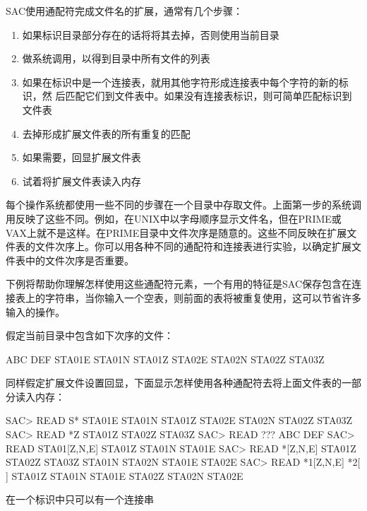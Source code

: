 SAC使用通配符完成文件名的扩展，通常有几个步骤：
\begin{enumerate}
\item 如果标识目录部分存在的话将将其去掉，否则使用当前目录
\item 做系统调用，以得到目录中所有文件的列表
\item 如果在标识中是一个连接表，就用其他字符形成连接表中每个字符的新的标识，然	  后匹配它们到文件表中。如果没有连接表标识，则可简单匹配标识到文件表
\item 去掉形成扩展文件表的所有重复的匹配
\item 如果需要，回显扩展文件表
\item 试着将扩展文件表读入内存
\end{enumerate}

每个操作系统都使用一些不同的步骤在一个目录中存取文件。上面第一步的系统调用反映了这些不同。例如，在UNIX中以字母顺序显示文件名，但在PRIME或VAX上就不是这样。在PRIME目录中文件次序是随意的。这些不同反映在扩展文件表的文件次序上。你可以用各种不同的通配符和连接表进行实验，以确定扩展文件表中的文件次序是否重要。

下例将帮助你理解怎样使用这些通配符元素，一个有用的特征是SAC保存包含在连接表上的字符串，当你输入一个空表，则前面的表将被重复使用，这可以节省许多输入的操作。

假定当前目录中包含如下次序的文件：
\begin{SACCode}
ABC DEF STA01E STA01N STA01Z STA02E STA02N STA02Z STA03Z
\end{SACCode}

同样假定扩展文件设置回显，下面显示怎样使用各种通配符去将上面文件表的一部分读入内存：
\begin{SACCode}
SAC> READ S*
 STA01E STA01N STA01Z STA02E STA02N STA02Z STA03Z
SAC> READ *Z
 STA01Z STA02Z STA03Z
SAC> READ ???
 ABC DEF
SAC> READ STA01[Z,N,E]
 STA01Z STA01N STA01E
SAC> READ *[Z,N,E]
 STA01Z STA02Z STA03Z STA01N STA02N STA01E STA02E
SAC> READ *1[Z,N,E] *2[ ]
 STA01Z STA01N STA01E STA02Z STA02N STA02E
\end{SACCode}

在一个标识中只可以有一个连接串
